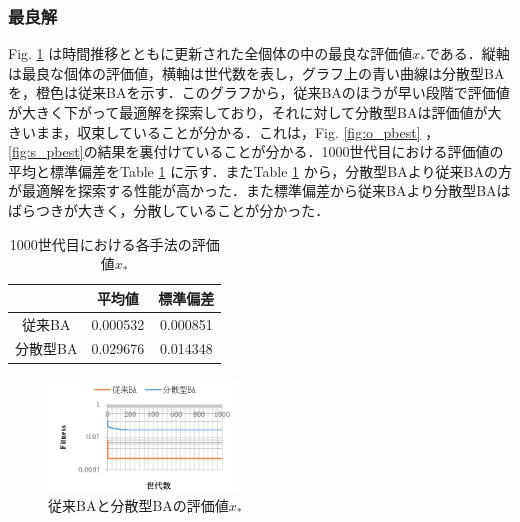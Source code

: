 \documentclass{jarticle}
\begin{document}
\subsubsection{最良解}
Fig. \ref{fig:gbest} は時間推移とともに更新された全個体の中の最良な評価値${x_*}$である．縦軸は最良な個体の評価値，横軸は世代数を表し，グラフ上の青い曲線は分散型BAを，橙色は従来BAを示す．このグラフから，従来BAのほうが早い段階で評価値が大きく下がって最適解を探索しており，それに対して分散型BAは評価値が大きいまま，収束していることが分かる．これは，Fig. \ref{fig:o_pbest} ，\ref{fig:s_pbest}の結果を裏付けていることが分かる．1000世代目における評価値の平均と標準偏差をTable \ref{tab2} に示す．またTable \ref{tab2} から，分散型BAより従来BAの方が最適解を探索する性能が高かった．また標準偏差から従来BAより分散型BAはばらつきが大きく，分散していることが分かった．
\begin{table}
\begin{center}
\caption{1000世代目における各手法の評価値${x_*}$}
\label{tab2}
\begin{tabular}{ccc}\hline
 &平均値 & 標準偏差\\  \hline\hline
従来BA & 0.000532 & 0.000851 \\ 
分散型BA & 0.029676 & 0.014348 \\ \hline
\end{tabular}
\end{center}
\end{table}

\begin{figure}[h]
\begin{center}
\includegraphics[width=0.45\textwidth]{gbest.bmp}
\caption{従来BAと分散型BAの評価値${x_*}$}
\label{fig:gbest}
\end{center}
\end{figure}

\end{document}
